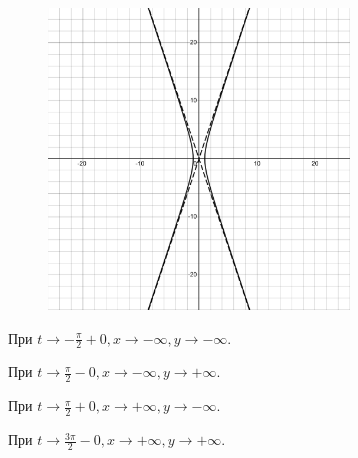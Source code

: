 \documentclass[14pt, a4paper, titlepage, fleqn]{extarticle}
\begin{document}
\begin{enumerate}
        \begin{figure}[H]
            \centering
            \includegraphics[width=8cm]{pictures/c_idz1_7.pdf}
        \end{figure}
        
        При \( t \to -\frac{\pi}{2} + 0, x \to -\infty, y \to -\infty \).

        При \( t \to \frac{\pi}{2} - 0, x \to -\infty, y \to +\infty \).

        При \( t \to \frac{\pi}{2} + 0, x \to +\infty, y \to -\infty \).

        При \( t \to \frac{3\pi}{2} - 0, x \to +\infty, y \to +\infty \).

        \pagebreak


\end{enumerate}
\end{document}

